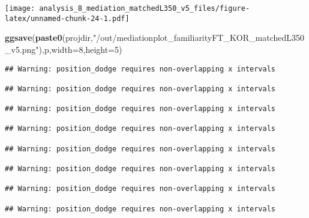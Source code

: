 \documentclass[
]{article}
\newenvironment{Shaded}{\begin{snugshade}}{\end{snugshade}}
\newcommand{\DataTypeTok}[1]{\textcolor[rgb]{0.13,0.29,0.53}{#1}}
\newcommand{\DecValTok}[1]{\textcolor[rgb]{0.00,0.00,0.81}{#1}}
\newcommand{\KeywordTok}[1]{\textcolor[rgb]{0.13,0.29,0.53}{\textbf{#1}}}
\newcommand{\NormalTok}[1]{#1}
\newcommand{\StringTok}[1]{\textcolor[rgb]{0.31,0.60,0.02}{#1}}
\begin{document}
\texttt{[image: analysis\_8\_mediation\_matchedL350\_v5\_files/figure-latex/unnamed-chunk-24-1.pdf]}

\begin{Shaded}
\begin{Highlighting}[]
\KeywordTok{ggsave}\NormalTok{(}\KeywordTok{paste0}\NormalTok{(projdir,}\StringTok{"/out/mediationplot_familiarityFT_KOR_matchedL350_v5.png"}\NormalTok{),p,}\DataTypeTok{width=}\DecValTok{8}\NormalTok{,}\DataTypeTok{height=}\DecValTok{5}\NormalTok{)}
\end{Highlighting}
\end{Shaded}

\begin{verbatim}
## Warning: position_dodge requires non-overlapping x intervals

## Warning: position_dodge requires non-overlapping x intervals

## Warning: position_dodge requires non-overlapping x intervals

## Warning: position_dodge requires non-overlapping x intervals

## Warning: position_dodge requires non-overlapping x intervals

## Warning: position_dodge requires non-overlapping x intervals

## Warning: position_dodge requires non-overlapping x intervals

## Warning: position_dodge requires non-overlapping x intervals
\end{verbatim}
\end{document}
